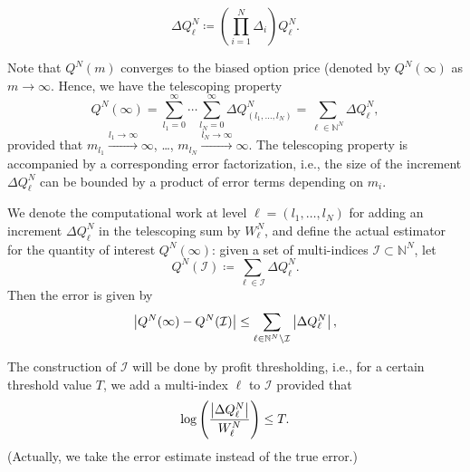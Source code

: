 \documentclass[11pt]{article}
\newcommand{\nset}{\mathbb{N}}
\begin{document}
%



\begin{equation}
\Delta Q^N_\ell \coloneqq \left( \prod_{i=1}^{N} \Delta_i \right) Q^N_\ell.
\end{equation}


Note that $Q^N(m)$ converges to the biased option price (denoted by $Q^N(\infty)$ as
$m \to \infty$. Hence, we have the telescoping property
\begin{equation}
Q^N(\infty) = \sum_{l_1=0}^\infty \cdots \sum_{l_{N} = 0}^\infty \Delta
Q^N_{(l_1, \ldots, l_{N})} = \sum_{\ell \in \mathbb{N}^{N}} \Delta Q^N_\ell,
\end{equation}
provided that $m_{l_1} \xrightarrow{l_1 \to \infty} \infty$, \ldots,
$m_{l_{N}} \xrightarrow{l_{N} \to \infty} \infty$. The telescoping property
is accompanied by a corresponding error factorization, i.e., the size of the
increment $\Delta Q^N_\ell$ can be bounded by a product of error terms depending
on $m_i$.


We denote the computational work at level $\ell = (l_1, \ldots, l_{N})$  for adding an increment $\Delta Q^N_{\ell}$
in the telescoping sum by  $W^N_\ell$, and   define the actual estimator for the quantity of interest
$Q^N(\infty)$: given a set of multi-indices $\mathcal{I} \subset
\mathbb{N}^{N}$, let
\begin{equation*}
	Q^N(\mathcal{I}) \coloneqq \sum_{\ell \in \mathcal{I}} \Delta Q^N_\ell.
\end{equation*}
Then the error is given by
\begin{equation*}
	\left\lvert Q^N(\infty) - Q^N(\mathcal{I})\right\rvert \le \sum_{\ell \in \mathbb{N}^{N} \setminus
		\mathcal{I}} \left\lvert\Delta Q^N_\ell\right\rvert,
\end{equation*}


The construction of $\mathcal{I}$ will be done by profit thresholding, i.e.,
for a certain threshold value $T$, we add a multi-index $\ell$ to
$\mathcal{I}$ provided that
\begin{equation*}
	\log\left( \frac{\left\lvert\Delta Q^N_\ell\right\rvert}{W_\ell^N} \right) \le T.
\end{equation*}
(Actually, we take the error estimate instead of the true error.)
\end{document}
